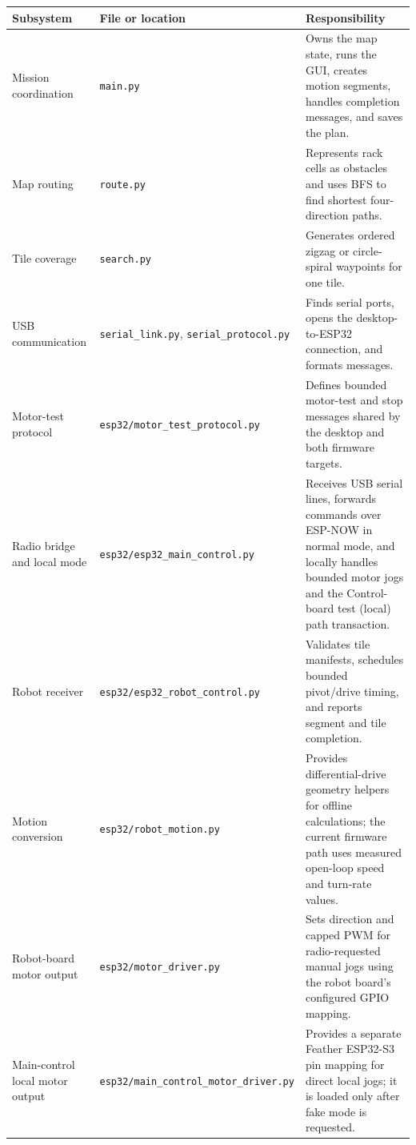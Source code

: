 \documentclass{article}
\begin{document}
\begin{center}
\begin{tabular}{>{\raggedright\arraybackslash}p{} >{\raggedright\arraybackslash}p{} >{\raggedright\arraybackslash}p{}}
\toprule
\textbf{Subsystem} & \textbf{File or location} & \textbf{Responsibility}\\
\midrule
Mission coordination & \texttt{main.py} & Owns the map state, runs the GUI, creates motion segments, handles completion messages, and saves the plan.\\
Map routing & \texttt{route.py} & Represents rack cells as obstacles and uses BFS to find shortest four-direction paths.\\
Tile coverage & \texttt{search.py} & Generates ordered zigzag or circle-spiral waypoints for one tile.\\
USB communication & \texttt{serial\_link.py}, \texttt{serial\_protocol.py} & Finds serial ports, opens the desktop-to-ESP32 connection, and formats messages.\\
Motor-test protocol & \texttt{esp32/motor\_test\_protocol.py} & Defines bounded motor-test and stop messages shared by the desktop and both firmware targets.\\
Radio bridge and local mode & \texttt{esp32/esp32\_main\_control.py} & Receives USB serial lines, forwards commands over ESP-NOW in normal mode, and locally handles bounded motor jogs and the Control-board test (local) path transaction.\\
Robot receiver & \texttt{esp32/esp32\_robot\_control.py} & Validates tile manifests, schedules bounded pivot/drive timing, and reports segment and tile completion.\\
Motion conversion & \texttt{esp32/robot\_motion.py} & Provides differential-drive geometry helpers for offline calculations; the current firmware path uses measured open-loop speed and turn-rate values.\\
Robot-board motor output & \texttt{esp32/motor\_driver.py} & Sets direction and capped PWM for radio-requested manual jogs using the robot board's configured GPIO mapping.\\
Main-control local motor output & \texttt{esp32/main\_control\_motor\_driver.py} & Provides a separate Feather ESP32-S3 pin mapping for direct local jogs; it is loaded only after fake mode is requested.\\
\bottomrule
\end{tabular}
\end{center}
\end{document}
